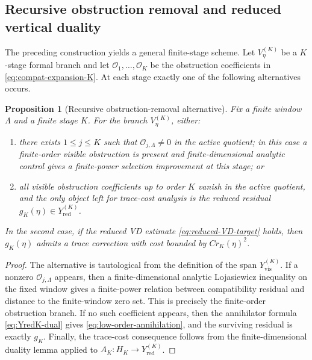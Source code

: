 \documentclass[11pt]{article}
\numberwithin{equation}{section}
\newtheorem{proposition}[theorem]{Proposition}
\newcommand{\calO}{\mathcal O}
\begin{document}
\subsection{Recursive obstruction removal and reduced vertical duality}\label{subsec:recursive-reduced-vd}

The preceding construction yields a general finite-stage scheme.  Let \(V_\eta^{(K)}\) be a \(K\)-stage formal branch and let \(\calO_1,\ldots,\calO_K\) be the obstruction coefficients in \eqref{eq:compat-expansion-K}.  At each stage exactly one of the following alternatives occurs.

\begin{proposition}[Recursive obstruction-removal alternative]\label{prop:recursive-obstruction-removal}
Fix a finite window \(\Lambda\) and a finite stage \(K\).  For the branch \(V_\eta^{(K)}\), either:
\begin{enumerate}[label=(\roman*)]
\item there exists \(1\le j\le K\) such that \(\calO_{j,\Lambda}\ne0\) in the active quotient; in this case a finite-order visible obstruction is present and finite-dimensional analytic control gives a finite-power selection improvement at this stage; or
\item all visible obstruction coefficients up to order \(K\) vanish in the active quotient, and the only object left for trace-cost analysis is the reduced residual \(g_K(\eta)\in Y_{\mathrm{red}}^{(K)}\).
\end{enumerate}
In the second case, if the reduced VD estimate \eqref{eq:reduced-VD-target} holds, then \(g_K(\eta)\) admits a trace correction with cost bounded by \(C r_K(\eta)^2\).
\end{proposition}

\begin{proof}
The alternative is tautological from the definition of the span \(Y_{\mathrm{vis}}^{(K)}\).  If a nonzero \(\calO_{j,\Lambda}\) appears, then a finite-dimensional analytic Lojasiewicz inequality on the fixed window gives a finite-power relation between compatibility residual and distance to the finite-window zero set.  This is precisely the finite-order obstruction branch.  If no such coefficient appears, then the annihilator formula \eqref{eq:YredK-dual} gives \eqref{eq:low-order-annihilation}, and the surviving residual is exactly \(g_K\).  Finally, the trace-cost consequence follows from the finite-dimensional duality lemma applied to \(A_K:H_K\to Y_{\mathrm{red}}^{(K)}\).
\end{proof}
\end{document}
